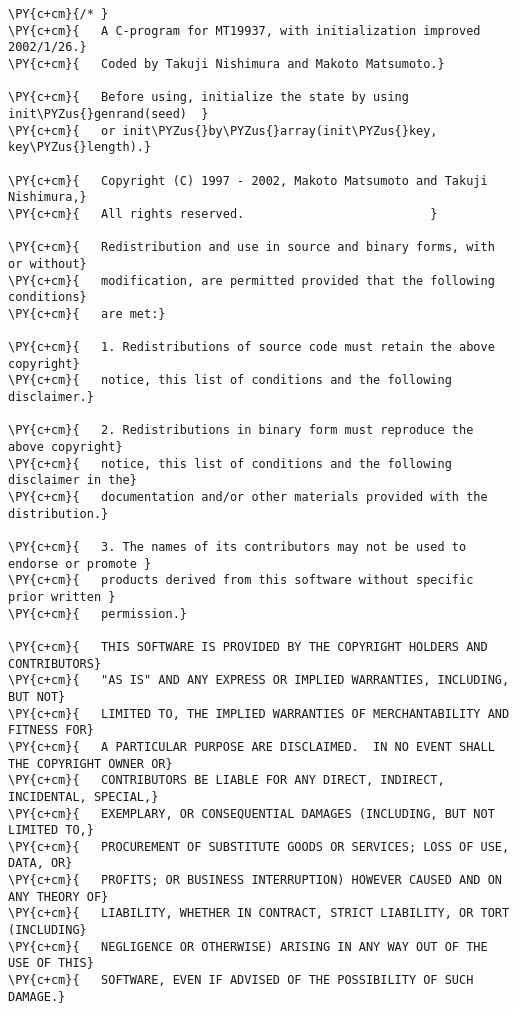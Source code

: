\begin{Verbatim}[commandchars=\\\{\}]
\PY{c+cm}{/* }
\PY{c+cm}{   A C-program for MT19937, with initialization improved 2002/1/26.}
\PY{c+cm}{   Coded by Takuji Nishimura and Makoto Matsumoto.}

\PY{c+cm}{   Before using, initialize the state by using init\PYZus{}genrand(seed)  }
\PY{c+cm}{   or init\PYZus{}by\PYZus{}array(init\PYZus{}key, key\PYZus{}length).}

\PY{c+cm}{   Copyright (C) 1997 - 2002, Makoto Matsumoto and Takuji Nishimura,}
\PY{c+cm}{   All rights reserved.                          }

\PY{c+cm}{   Redistribution and use in source and binary forms, with or without}
\PY{c+cm}{   modification, are permitted provided that the following conditions}
\PY{c+cm}{   are met:}

\PY{c+cm}{   1. Redistributions of source code must retain the above copyright}
\PY{c+cm}{   notice, this list of conditions and the following disclaimer.}

\PY{c+cm}{   2. Redistributions in binary form must reproduce the above copyright}
\PY{c+cm}{   notice, this list of conditions and the following disclaimer in the}
\PY{c+cm}{   documentation and/or other materials provided with the distribution.}

\PY{c+cm}{   3. The names of its contributors may not be used to endorse or promote }
\PY{c+cm}{   products derived from this software without specific prior written }
\PY{c+cm}{   permission.}

\PY{c+cm}{   THIS SOFTWARE IS PROVIDED BY THE COPYRIGHT HOLDERS AND CONTRIBUTORS}
\PY{c+cm}{   "AS IS" AND ANY EXPRESS OR IMPLIED WARRANTIES, INCLUDING, BUT NOT}
\PY{c+cm}{   LIMITED TO, THE IMPLIED WARRANTIES OF MERCHANTABILITY AND FITNESS FOR}
\PY{c+cm}{   A PARTICULAR PURPOSE ARE DISCLAIMED.  IN NO EVENT SHALL THE COPYRIGHT OWNER OR}
\PY{c+cm}{   CONTRIBUTORS BE LIABLE FOR ANY DIRECT, INDIRECT, INCIDENTAL, SPECIAL,}
\PY{c+cm}{   EXEMPLARY, OR CONSEQUENTIAL DAMAGES (INCLUDING, BUT NOT LIMITED TO,}
\PY{c+cm}{   PROCUREMENT OF SUBSTITUTE GOODS OR SERVICES; LOSS OF USE, DATA, OR}
\PY{c+cm}{   PROFITS; OR BUSINESS INTERRUPTION) HOWEVER CAUSED AND ON ANY THEORY OF}
\PY{c+cm}{   LIABILITY, WHETHER IN CONTRACT, STRICT LIABILITY, OR TORT (INCLUDING}
\PY{c+cm}{   NEGLIGENCE OR OTHERWISE) ARISING IN ANY WAY OUT OF THE USE OF THIS}
\PY{c+cm}{   SOFTWARE, EVEN IF ADVISED OF THE POSSIBILITY OF SUCH DAMAGE.}



\end{Verbatim}

